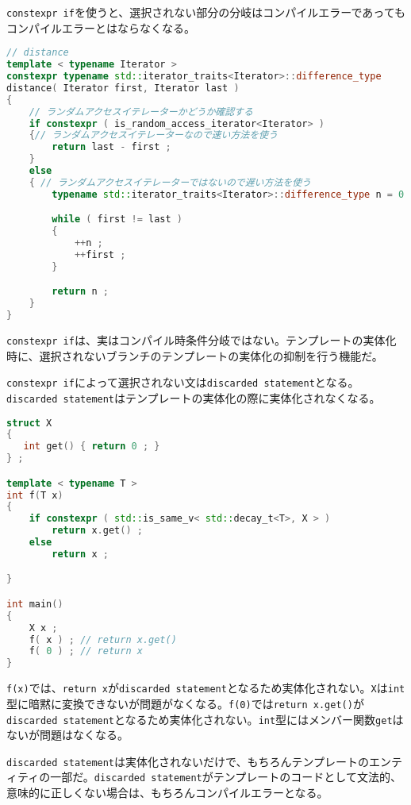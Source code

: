 \lstinline!constexpr if!を使うと、選択されない部分の分岐はコンパイルエラーであってもコンパイルエラーとはならなくなる。

\begin{lstlisting}[language=C++]
// distance
template < typename Iterator >
constexpr typename std::iterator_traits<Iterator>::difference_type
distance( Iterator first, Iterator last )
{
    // ランダムアクセスイテレーターかどうか確認する
    if constexpr ( is_random_access_iterator<Iterator> )
    {// ランダムアクセスイテレーターなので速い方法を使う
        return last - first ;
    }
    else
    { // ランダムアクセスイテレーターではないので遅い方法を使う
        typename std::iterator_traits<Iterator>::difference_type n = 0 ;

        while ( first != last )
        {
            ++n ;
            ++first ;
        }

        return n ;
    }
}
\end{lstlisting}

%

\lstinline!constexpr if!は、実はコンパイル時条件分岐ではない。テンプレートの実体化時に、選択されないブランチのテンプレートの実体化の抑制を行う機能だ。

\lstinline!constexpr if!によって選択されない文は\lstinline!discarded statement!となる。\lstinline!discarded statement!はテンプレートの実体化の際に実体化されなくなる。

\begin{lstlisting}[language=C++]
struct X
{
   int get() { return 0 ; } 
} ;

template < typename T >
int f(T x)
{
    if constexpr ( std::is_same_v< std::decay_t<T>, X > )
        return x.get() ;
    else
        return x ;

}

int main()
{
    X x ;
    f( x ) ; // return x.get() 
    f( 0 ) ; // return x
}
\end{lstlisting}

\lstinline!f(x)!では、\lstinline!return x!が\lstinline!discarded statement!となるため実体化されない。\lstinline!X!は\lstinline!int!型に暗黙に変換できないが問題がなくなる。\lstinline!f(0)!では\lstinline!return x.get()!が\lstinline!discarded statement!となるため実体化されない。\lstinline!int!型にはメンバー関数\lstinline!get!はないが問題はなくなる。

\lstinline!discarded statement!は実体化されないだけで、もちろんテンプレートのエンティティの一部だ。\lstinline!discarded statement!がテンプレートのコードとして文法的、意味的に正しくない場合は、もちろんコンパイルエラーとなる。


